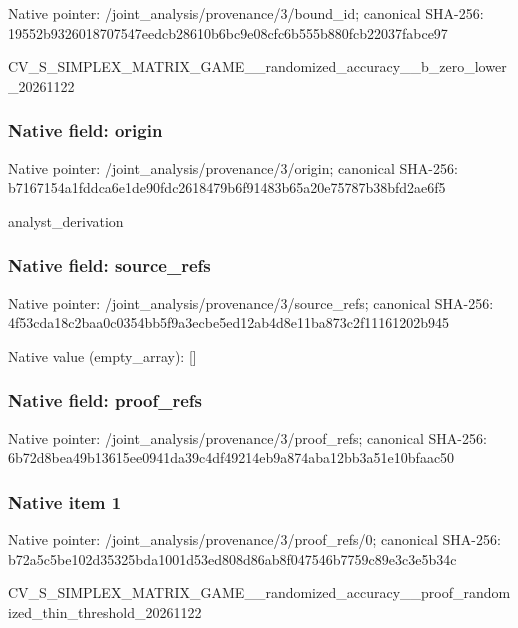\documentclass[10pt,a4paper]{article}
\begin{document}
Native pointer: /joint\_analysis/provenance/3/bound\_id; canonical SHA-256: 19552b9326018707547eedcb\allowbreak{}28610b6bc9e08cfc6b555b88\allowbreak{}0fcb22037fabce97


CV\_S\_SIMPLEX\_MATRIX\_GAME\allowbreak{}\_\_randomized\_accuracy\_\_b\allowbreak{}\_zero\_lower\_20261122


\subsubsection{Native field: origin}


Native pointer: /joint\_analysis/provenance/3/origin; canonical SHA-256: b7167154a1fddca6e1de90fd\allowbreak{}c2618479b6f91483b65a20e7\allowbreak{}5787b38bfd2ae6f5


analyst\_derivation


\subsubsection{Native field: source\_refs}


Native pointer: /joint\_analysis/provenan\allowbreak{}ce/3/source\_refs; canonical SHA-256: 4f53cda18c2baa0c0354bb5f\allowbreak{}9a3ecbe5ed12ab4d8e11ba87\allowbreak{}3c2f11161202b945



Native value (empty\_array): []



\subsubsection{Native field: proof\_refs}


Native pointer: /joint\_analysis/provenance/3/proof\_refs; canonical SHA-256: 6b72d8bea49b13615ee0941d\allowbreak{}a39c4df49214eb9a874aba12\allowbreak{}bb3a51e10bfaac50



\subsubsection{Native item 1}


Native pointer: /joint\_analysis/provenan\allowbreak{}ce/3/proof\_refs/0; canonical SHA-256: b72a5c5be102d35325bda100\allowbreak{}1d53ed808d86ab8f047546b7\allowbreak{}759c89e3c3e5b34c


CV\_S\_SIMPLEX\_MATRIX\_GAME\allowbreak{}\_\_randomized\_accuracy\_\_p\allowbreak{}roof\_randomized\_thin\_thr\allowbreak{}eshold\_20261122
\end{document}
